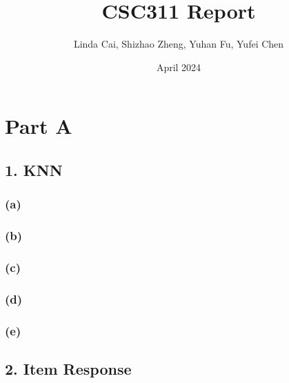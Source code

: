 \documentclass[12pt]{article}
\title{CSC311 Report}
\author{Linda Cai, Shizhao Zheng, Yuhan Fu, Yufei Chen}
\date{April 2024}
\begin{document}
\maketitle
\section*{Part A}
\subsection*{1. KNN}
\subsubsection*{(a)}
\subsubsection*{(b)}
\subsubsection*{(c)}
\subsubsection*{(d)}
\subsubsection*{(e)}

\newpage
\subsection*{2. Item Response}
\end{document}
